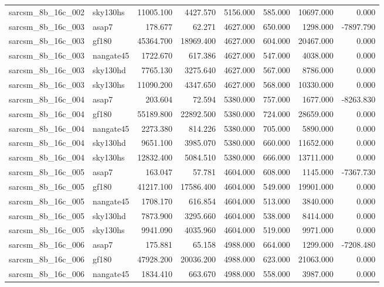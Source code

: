 \begin{tabular}{llrrrrrr}
sarcsm\_8b\_16c\_002 & sky130hs & 11005.100 & 4427.570 & 5156.000 & 585.000 & 10697.000 & 0.000 \\
sarcsm\_8b\_16c\_003 & asap7 & 178.677 & 62.271 & 4627.000 & 650.000 & 1298.000 & -7897.790 \\
sarcsm\_8b\_16c\_003 & gf180 & 45364.700 & 18969.400 & 4627.000 & 604.000 & 20467.000 & 0.000 \\
sarcsm\_8b\_16c\_003 & nangate45 & 1722.670 & 617.386 & 4627.000 & 547.000 & 4038.000 & 0.000 \\
sarcsm\_8b\_16c\_003 & sky130hd & 7765.130 & 3275.640 & 4627.000 & 567.000 & 8786.000 & 0.000 \\
sarcsm\_8b\_16c\_003 & sky130hs & 11090.200 & 4347.650 & 4627.000 & 568.000 & 10330.000 & 0.000 \\
sarcsm\_8b\_16c\_004 & asap7 & 203.604 & 72.594 & 5380.000 & 757.000 & 1677.000 & -8263.830 \\
sarcsm\_8b\_16c\_004 & gf180 & 55189.800 & 22892.500 & 5380.000 & 724.000 & 28659.000 & 0.000 \\
sarcsm\_8b\_16c\_004 & nangate45 & 2273.380 & 814.226 & 5380.000 & 705.000 & 5890.000 & 0.000 \\
sarcsm\_8b\_16c\_004 & sky130hd & 9651.100 & 3985.070 & 5380.000 & 660.000 & 11652.000 & 0.000 \\
sarcsm\_8b\_16c\_004 & sky130hs & 12832.400 & 5084.510 & 5380.000 & 666.000 & 13711.000 & 0.000 \\
sarcsm\_8b\_16c\_005 & asap7 & 163.047 & 57.781 & 4604.000 & 608.000 & 1145.000 & -7367.730 \\
sarcsm\_8b\_16c\_005 & gf180 & 41217.100 & 17586.400 & 4604.000 & 549.000 & 19901.000 & 0.000 \\
sarcsm\_8b\_16c\_005 & nangate45 & 1708.170 & 616.854 & 4604.000 & 513.000 & 3840.000 & 0.000 \\
sarcsm\_8b\_16c\_005 & sky130hd & 7873.900 & 3295.660 & 4604.000 & 538.000 & 8414.000 & 0.000 \\
sarcsm\_8b\_16c\_005 & sky130hs & 9941.090 & 4035.960 & 4604.000 & 519.000 & 9971.000 & 0.000 \\
sarcsm\_8b\_16c\_006 & asap7 & 175.881 & 65.158 & 4988.000 & 664.000 & 1299.000 & -7208.480 \\
sarcsm\_8b\_16c\_006 & gf180 & 47928.200 & 20036.200 & 4988.000 & 623.000 & 21063.000 & 0.000 \\
sarcsm\_8b\_16c\_006 & nangate45 & 1834.410 & 663.670 & 4988.000 & 558.000 & 3987.000 & 0.000 \\

\end{tabular}

